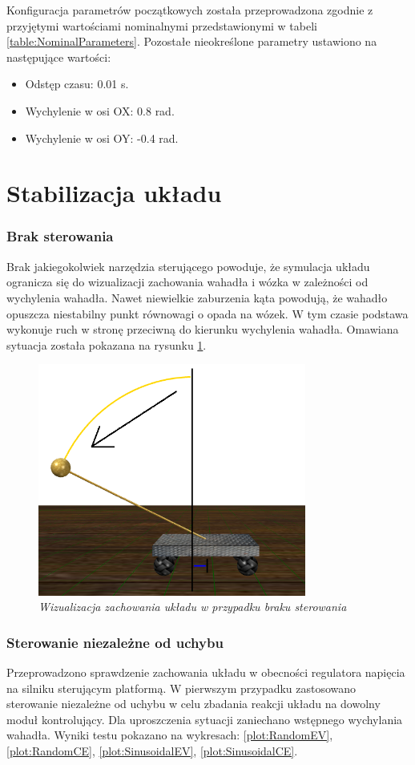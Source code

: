 \documentclass[12pt, oneside]{report}
\theoremstyle{definition}
\begin{document}
Konfiguracja parametrów początkowych została przeprowadzona zgodnie z przyjętymi wartościami nominalnymi przedstawionymi w tabeli \ref{table:NominalParameters}. Pozostałe nieokreślone parametry ustawiono na następujące wartości:
\begin{itemize}
\item Odstęp czasu: 0.01 s.
\item Wychylenie w osi OX: 0.8 rad.
\item Wychylenie w osi OY: -0.4 rad.
\end{itemize}

\section{Stabilizacja układu}
\subsubsection{Brak sterowania}
Brak jakiegokolwiek narzędzia sterującego powoduje, że symulacja układu ogranicza się do wizualizacji zachowania wahadła i wózka w zależności od wychylenia wahadła. Nawet niewielkie zaburzenia kąta powodują, że wahadło opuszcza niestabilny punkt równowagi o opada na wózek. W tym czasie podstawa wykonuje ruch w stronę przeciwną do kierunku wychylenia wahadła. Omawiana sytuacja została pokazana na rysunku \ref{figure:ModelWithoutControl}.

\begin{figure}[H]
	\centering
		\includegraphics[width = 250pt]{ModelWithoutControl} 
		\caption{\textit{Wizualizacja zachowania układu w przypadku braku sterowania}}
		\label{figure:ModelWithoutControl}
\end{figure}

\subsubsection{Sterowanie niezależne od uchybu}
Przeprowadzono sprawdzenie zachowania układu w obecności regulatora napięcia na silniku sterującym platformą. W pierwszym przypadku zastosowano sterowanie niezależne od uchybu w celu zbadania reakcji układu na dowolny moduł kontrolujący. Dla uproszczenia sytuacji zaniechano wstępnego wychylania wahadła. Wyniki testu pokazano na wykresach: \ref{plot:RandomEV}, \ref{plot:RandomCE}, \ref{plot:SinusoidalEV}, \ref{plot:SinusoidalCE}.
\end{document}
